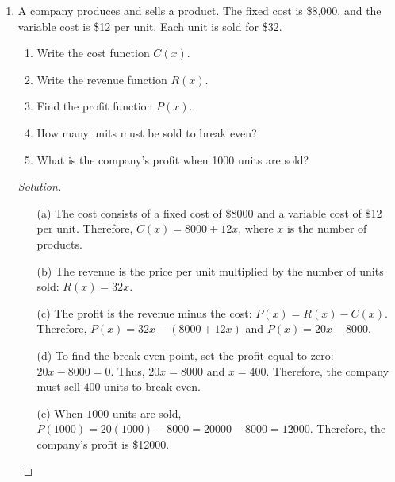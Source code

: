 \documentclass[12pt]{article}
\newenvironment{solution}{\begin{proof}[Solution]}{\end{proof}}
\begin{document}
\begin{enumerate}
		\begin{solution}
			\begin{itemize} 
				\item[(a)] The ticket price increases by \$5 for each increase, so the price function is $p(x)=40+5x$. 
				\item[(b)] The number of tickets sold decreases by 100 for each increase, so the number of tickets sold is $q(x)=1800-100x$.
				\item[(c)] The revenue is given by $R(x)=p(x)q(x)$. Therefore, $R(x)=(40+5x)(1800-100x)$. Expanding, $R(x)=-500x^2+5000x+72000$. 
				\item[(d)] Since the revenue function is a quadratic function that opens downward, its maximum occurs at the vertex. The $x$-coordinate of the vertex is $x=-\dfrac{b}{2a} =-\dfrac{5000}{2(-500)} =5$. Thus, the ticket price that produces the greatest revenue is $p(5)=40+5(5)=65$. Therefore, the ticket price should be \$65. 
				\item[(e)] The maximum revenue is $R(5)=-500(5)^2+5000(5)+72000=-12500+25000+72000 =84500$. Therefore, the maximum revenue is \$84500. 
			\end{itemize}
		\end{solution}
		
		\item A company produces and sells a product. The fixed cost is \$8,000, and the variable cost is \$12 per unit. Each unit is sold for \$32.
		
		\begin{enumerate}
			\item Write the cost function $C(x)$.
			\item Write the revenue function $R(x)$.
			\item Find the profit function $P(x)$.
			\item How many units must be sold to break even?
			\item What is the company's profit when 1000 units are sold?
		\end{enumerate}
		\begin{solution}
			\begin{itemize}
				\item[(a)] The cost consists of a fixed cost of \$8000 and a variable cost of \$12 per unit. Therefore, $C(x)=8000+12x$, where $x$ is the number of products.
				\item[(b)] The revenue is the price per unit multiplied by the number of units sold: $ R(x)=32x$. 
				\item[(c)] The profit is the revenue minus the cost: $P(x)=R(x)-C(x)$. Therefore, $P(x)=32x-(8000+12x)$ and $P(x)=20x-8000$.
				\item[(d)] To find the break-even point, set the profit equal to zero: $20x-8000=0$. Thus, $20x=8000$ and $x=400$. Therefore, the company must sell $400$ units to break even. 
				\item[(e)] When $1000$ units are sold, $P(1000)=20(1000)-8000 =20000-8000 = 12000$. Therefore, the company's profit is \$12000.
			\end{itemize}
		\end{solution}
		

\end{enumerate}
\end{document}
